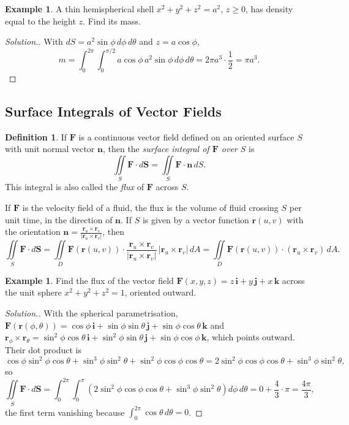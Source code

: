 \documentclass[11pt,a4paper]{article}
\theoremstyle{definition}
\newtheorem{defn}[thm]{Definition}
\newtheorem{exa}[thm]{Example}
\newenvironment{solution}
  {\renewcommand{\qedsymbol}{}\begin{proof}[\textit{Solution}.]}
  {\end{proof}}
\begin{document}
\begin{exa}
\label{ex:hemispheremass}
A thin hemispherical shell $x^2 + y^2 + z^2 = a^2$, $z\geq 0$, has density equal
to the height $z$. Find its mass.
\end{exa}

\begin{solution}
With $dS = a^2\sin\phi\,d\phi\,d\theta$ and $z = a\cos\phi$,
\[m = \int_0^{2\pi}\int_0^{\pi/2}a\cos\phi\,a^2\sin\phi\,d\phi\,d\theta =
2\pi a^3\cdot\frac12 = \pi a^3 .\]
\end{solution}

{\color[wave]{485}\subsection{Surface Integrals of Vector Fields}}

\begin{defn}
\label{defn:flux}
If $\mathbf F$ is a continuous vector field defined on an oriented surface $S$
with unit normal vector $\mathbf n$, then the \emph{surface integral of
$\mathbf F$ over $S$} is
\[\iint\limits_S \mathbf F\cdot d\mathbf S = \iint\limits_S \mathbf F\cdot
\mathbf n\, dS .\]
This integral is also called the \emph{flux} of $\mathbf F$ across $S$.
\end{defn}

If $\mathbf F$ is the velocity field of a fluid, the flux is the volume of fluid
crossing $S$ per unit time, in the direction of $\mathbf n$. If $S$ is given by a
vector function $\mathbf r(u,v)$ with the orientation
$\mathbf n = \frac{\mathbf r_u\times\mathbf r_v}{|\mathbf r_u\times\mathbf r_v|}$,
then
\[\iint\limits_S \mathbf F\cdot d\mathbf S = \iint\limits_D \mathbf F(\mathbf
r(u,v))\cdot \frac{\mathbf r_u \times \mathbf r_v}{|\mathbf r_u \times \mathbf
r_v|}\, |\mathbf r_u \times \mathbf r_v|\,dA = \iint\limits_D \mathbf F(\mathbf
r(u,v))\cdot (\mathbf r_u \times \mathbf r_v) \,dA .\]

\begin{exa}
\label{ex:fluxsphere}
Find the flux of the vector field $\mathbf F(x,y,z) = z\,\mathbf i + y\,\mathbf j
+ x\, \mathbf k$ across the unit sphere $x^2 + y^2 + z^2 = 1$, oriented outward.
\end{exa}

\begin{solution}
With the spherical parametrisation,
$\mathbf F(\mathbf r(\phi,\theta)) = \cos \phi\, \mathbf i + \sin \phi \sin
\theta \,\mathbf j + \sin \phi \cos \theta \,\mathbf k$ and
$\mathbf r_\phi\times\mathbf r_\theta = \sin^2 \phi \cos \theta\, \mathbf i +
\sin^2\phi \sin \theta\, \mathbf j + \sin \phi \cos \phi\, \mathbf k$, which
points outward. Their dot product is
\[\cos \phi \sin^2 \phi \cos \theta + \sin^3\phi \sin^2\theta + \sin^2\phi
\cos\phi \cos \theta = 2\sin^2\phi\cos\phi\cos\theta + \sin^3\phi\sin^2\theta ,\]
so
\[\iint\limits_S \mathbf F\cdot d\mathbf S = \int^{2\pi}_0\int^{\pi}_0
\left(2\sin^2\phi \cos\phi\cos \theta + \sin^3\phi \sin^2\theta\right)d\phi\,
d\theta = 0 + \frac43\cdot\pi = \frac{4\pi}{3},\]
the first term vanishing because $\int_0^{2\pi}\cos\theta\,d\theta = 0$.
\end{solution}
\end{document}
